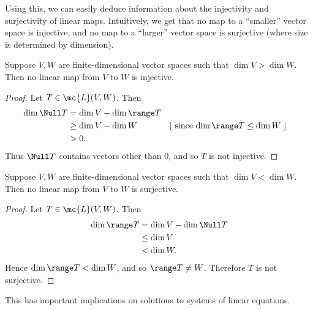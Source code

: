 \documentclass[math0540-lecture-notes.tex]{subfiles}
\begin{document}
Using this, we can easily deduce information about the injectivity and surjectivity of linear maps.
Intuitively, we get that no map to a ``smaller'' vector space is injective, and no map to a
``larger'' vector space is surjective (where size is determined by dimension).

\begin{proposition}{}
  Suppose $V,W$ are finite-dimensional vector spaces such that $\dim V > \dim W$. Then no linear map
  from $V$ to $W$ is injective.
\end{proposition}
\begin{proof}[Proof]
  Let $T\in \mc{L}(V,W)$. Then
  \begin{align*}
    \dim \Null T &= \dim V - \dim \range T\\
                 &\ge \dim V - \dim W&&[~\text{since $ \dim\range T \le \dim W$}~]\\
                 &> 0
  .\end{align*}
  Thus $ \Null T$ contains vectors other than $0$, and so $T$ is not injective.
\end{proof}

\begin{proposition}{}
  Suppose $V,W$ are finite-dimensional vector spaces such that $\dim V < \dim W$. Then no linear map
  from $V$ to $W$ is surjective.
\end{proposition}
\begin{proof}[Proof]
  Let $T\in \mc{L}(V,W)$. Then
  \begin{align*}
    \dim\range T &= \dim V - \dim\Null T\\
                 &\le \dim V\\
                 &< \dim W
  .\end{align*} Hence $\dim \range T < \dim W$, and so $\range T \neq W$. Therefore $T$ is not
  surjective.
\end{proof}

This has important implications on solutions to systems of linear equations.
\end{document}
